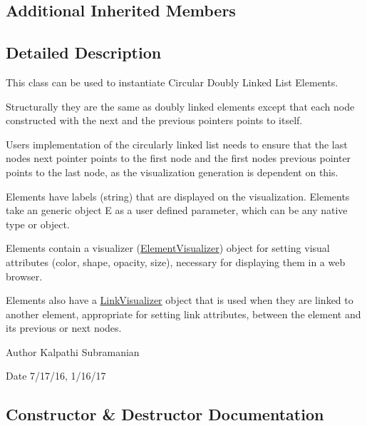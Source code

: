 \subsection*{Additional Inherited Members}


\subsection{Detailed Description}
This class can be used to instantiate Circular Doubly Linked List Elements. 

Structurally they are the same as doubly linked elements except that each node constructed with the next and the previous pointers points to itself.

User\textquotesingle{}s implementation of the circularly linked list needs to ensure that the last node\textquotesingle{}s next pointer points to the first node and the first node\textquotesingle{}s previous pointer points to the last node, as the visualization generation is dependent on this.

Elements have labels (string) that are displayed on the visualization. Elements take an generic object E as a user defined parameter, which can be any native type or object.

Elements contain a visualizer (\hyperlink{namespace_bridges_1_1_element_visualizer}{Element\+Visualizer}) object for setting visual attributes (color, shape, opacity, size), necessary for displaying them in a web browser.

Elements also have a \hyperlink{namespace_bridges_1_1_link_visualizer}{Link\+Visualizer} object that is used when they are linked to another element, appropriate for setting link attributes, between the element and its previous or next nodes.

\begin{DoxyAuthor}{Author}
Kalpathi Subramanian
\end{DoxyAuthor}
\begin{DoxyDate}{Date}
7/17/16, 1/16/17 
\end{DoxyDate}


\subsection{Constructor \& Destructor Documentation}
\hypertarget{class_bridges_1_1_circ_d_lelement_1_1_circ_d_lelement_a48a58c226d5d85a3bcce77e974bb78d3}{}
